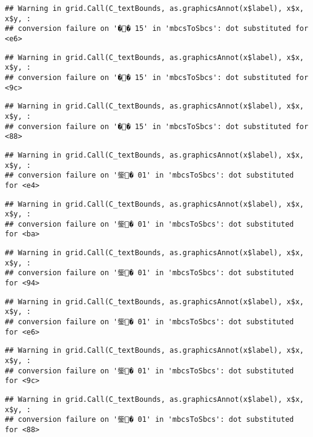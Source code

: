 \documentclass[]{article}
\begin{document}
\begin{verbatim}
## Warning in grid.Call(C_textBounds, as.graphicsAnnot(x$label), x$x, x$y, :
## conversion failure on '�� 15' in 'mbcsToSbcs': dot substituted for <e6>
\end{verbatim}

\begin{verbatim}
## Warning in grid.Call(C_textBounds, as.graphicsAnnot(x$label), x$x, x$y, :
## conversion failure on '�� 15' in 'mbcsToSbcs': dot substituted for <9c>
\end{verbatim}

\begin{verbatim}
## Warning in grid.Call(C_textBounds, as.graphicsAnnot(x$label), x$x, x$y, :
## conversion failure on '�� 15' in 'mbcsToSbcs': dot substituted for <88>
\end{verbatim}

\begin{verbatim}
## Warning in grid.Call(C_textBounds, as.graphicsAnnot(x$label), x$x, x$y, :
## conversion failure on '鈭� 01' in 'mbcsToSbcs': dot substituted for <e4>
\end{verbatim}

\begin{verbatim}
## Warning in grid.Call(C_textBounds, as.graphicsAnnot(x$label), x$x, x$y, :
## conversion failure on '鈭� 01' in 'mbcsToSbcs': dot substituted for <ba>
\end{verbatim}

\begin{verbatim}
## Warning in grid.Call(C_textBounds, as.graphicsAnnot(x$label), x$x, x$y, :
## conversion failure on '鈭� 01' in 'mbcsToSbcs': dot substituted for <94>
\end{verbatim}

\begin{verbatim}
## Warning in grid.Call(C_textBounds, as.graphicsAnnot(x$label), x$x, x$y, :
## conversion failure on '鈭� 01' in 'mbcsToSbcs': dot substituted for <e6>
\end{verbatim}

\begin{verbatim}
## Warning in grid.Call(C_textBounds, as.graphicsAnnot(x$label), x$x, x$y, :
## conversion failure on '鈭� 01' in 'mbcsToSbcs': dot substituted for <9c>
\end{verbatim}

\begin{verbatim}
## Warning in grid.Call(C_textBounds, as.graphicsAnnot(x$label), x$x, x$y, :
## conversion failure on '鈭� 01' in 'mbcsToSbcs': dot substituted for <88>
\end{verbatim}
\end{document}

